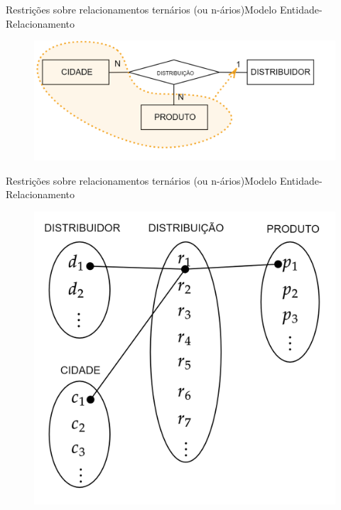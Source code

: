 \documentclass[t]{beamer}
\begin{document}

\begin{ftst}{Restrições sobre relacionamentos ternários
(ou n-ários)}{Modelo Entidade-Relacionamento}

\begin{figure}
    \centering
    \includegraphics[scale=0.2]{Figuras/01_27.png}
\end{figure}

\end{ftst}


\begin{ftst}{Restrições sobre relacionamentos ternários
(ou n-ários)}{Modelo Entidade-Relacionamento}

\begin{figure}
    \centering
    \includegraphics[scale=0.16]{Figuras/01_31.png}
\end{figure}

\end{ftst}
\end{document}
